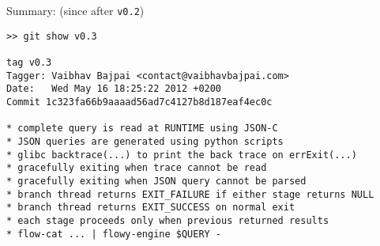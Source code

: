 Summary: (since after \lstinline!v0.2!)

\begin{lstlisting}
>> git show v0.3                                                                                                                                                                                   

tag v0.3
Tagger: Vaibhav Bajpai <contact@vaibhavbajpai.com>
Date:   Wed May 16 18:25:22 2012 +0200
Commit 1c323fa66b9aaaad56ad7c4127b8d187eaf4ec0c

* complete query is read at RUNTIME using JSON-C
* JSON queries are generated using python scripts
* glibc backtrace(...) to print the back trace on errExit(...)
* gracefully exiting when trace cannot be read
* gracefully exiting when JSON query cannot be parsed
* branch thread returns EXIT_FAILURE if either stage returns NULL
* branch thread returns EXIT_SUCCESS on normal exit
* each stage proceeds only when previous returned results
* flow-cat ... | flowy-engine $QUERY -  
\end{lstlisting}


